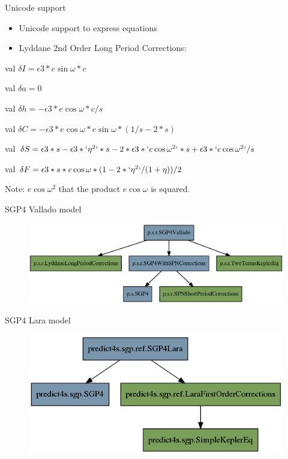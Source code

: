 \documentclass[10pt, compress, xcolor={usenames,dvipsnames}]{beamer}
\newcommand{\SmallArrow}{\ding{228}}
\begin{document}
\begin{frame}[fragile]{Unicode support}

  \begin{itemize}[label=\SmallArrow]
    \item Unicode support to express equations
	\item Lyddane 2nd Order Long Period Corrections:
  \end{itemize}


val $\delta I =  \epsilon 3*e\sin\omega * c$

val $\delta a =  0$

val $\delta h = -\epsilon 3*e\cos\omega* c/s$

val $\delta C = -\epsilon 3*e\cos\omega* e\sin\omega * (1/s - 2*s)$

val $\delta S =  \epsilon 3*s - \epsilon 3*`\eta^2`*s - 2*\epsilon 3*`e\cos\omega ^2`*s + \epsilon 3*`e\cos\omega ^2`/s$

val $\delta F =  \epsilon 3*s* e\cos\omega * (1 - 2*`\eta^2`/(1+\eta)) / 2$

Note: $e\cos\omega ^2$ that the product $e\cos\omega$ is squared.


\end{frame}


\begin{frame}[fragile]{SGP4 Vallado model}
  \begin{figure}
    \centering
    \includegraphics[width = 1.0\textwidth]{vallado}
  \end{figure}
\end{frame}

\begin{frame}[fragile]{SGP4 Lara model}
  \begin{figure}
    \centering
    \includegraphics[width = 1.0\textwidth]{lara}
  \end{figure}
\end{frame}
\end{document}
